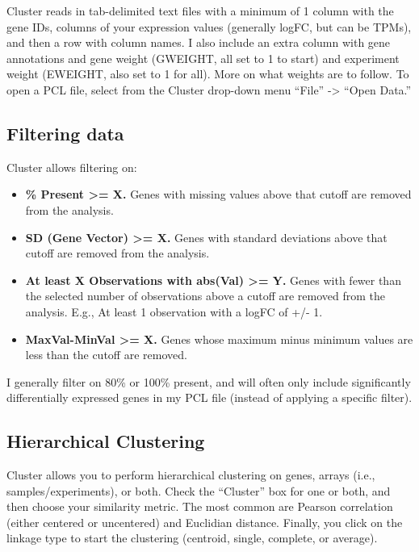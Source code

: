 \documentclass[
]{book}
\begin{document}
Cluster reads in tab-delimited text files with a minimum of 1 column with the gene IDs, columns of your expression values (generally logFC, but can be TPMs), and then a row with column names. I also include an extra column with gene annotations and gene weight (GWEIGHT, all set to 1 to start) and experiment weight (EWEIGHT, also set to 1 for all). More on what weights are to follow. To open a PCL file, select from the Cluster drop-down menu ``File'' -\textgreater{} ``Open Data.''

\hypertarget{filtering-data}{%
\subsection{Filtering data}\label{filtering-data}}

Cluster allows filtering on:

\begin{itemize}
\item
  \textbf{\% Present \textgreater= X.} Genes with missing values above that cutoff are removed from the analysis.
\item
  \textbf{SD (Gene Vector) \textgreater= X.} Genes with standard deviations above that cutoff are removed from the analysis.
\item
  \textbf{At least X Observations with abs(Val) \textgreater= Y.} Genes with fewer than the selected number of observations above a cutoff are removed from the analysis. E.g., At least 1 observation with a logFC of +/- 1.
\item
  \textbf{MaxVal-MinVal \textgreater= X.} Genes whose maximum minus minimum values are less than the cutoff are removed.
\end{itemize}

I generally filter on 80\% or 100\% present, and will often only include significantly differentially expressed genes in my PCL file (instead of applying a specific filter).

\hypertarget{hierarchical-clustering}{%
\subsection{Hierarchical Clustering}\label{hierarchical-clustering}}

Cluster allows you to perform hierarchical clustering on genes, arrays (i.e., samples/experiments), or both. Check the ``Cluster'' box for one or both, and then choose your similarity metric. The most common are Pearson correlation (either centered or uncentered) and Euclidian distance. Finally, you click on the linkage type to start the clustering (centroid, single, complete, or average).
\end{document}
